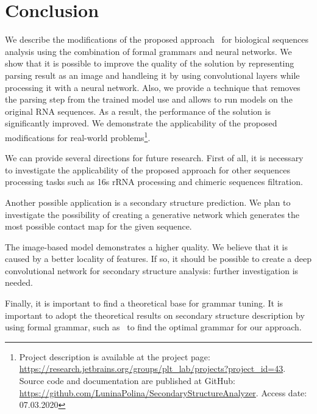 \documentclass[runningheads]{llncs}
\begin{document}
\section{Conclusion}
We describe the modifications of the proposed approach~\cite{grigorevcomposition} for biological sequences analysis using the combination of formal grammars and neural networks.
We show that it is possible to improve the quality of the solution by representing parsing result as an image and handleing it by using convolutional layers while processing it with a neural network.
Also, we provide a technique that removes the parsing step from the trained model use and allows to run models on the original RNA sequences.
As a result, the performance of the solution is significantly improved.
We demonstrate the applicability of the proposed modifications for real-world problems\footnote{
Project description is available at the project page: \url{https://research.jetbrains.org/groups/plt\_lab/projects?project\_id=43}.
Source code and documentation are published at GitHub: \url{https://github.com/LuninaPolina/SecondaryStructureAnalyzer}. Access date: 07.03.2020}.

We can provide several directions for future research.
First of all, it is necessary to investigate the applicability of the proposed approach for other sequences processing tasks such as 16s rRNA processing and chimeric sequences filtration.

Another possible application is a secondary structure prediction.
We plan to investigate the possibility of creating a generative network which generates the most possible contact map for the given sequence.

The image-based model demonstrates a higher quality.
We believe that it is caused by a better locality of features.
If so, it should be possible to create a deep convolutional network for secondary structure analysis: further investigation is needed.

Finally, it is important to find a theoretical base for grammar tuning.
It is important to adopt the theoretical results on secondary structure description by using formal grammar, such as~\cite{MQbioinformatics19} to find the optimal grammar for our approach.
%
%
%


%
\end{document}
